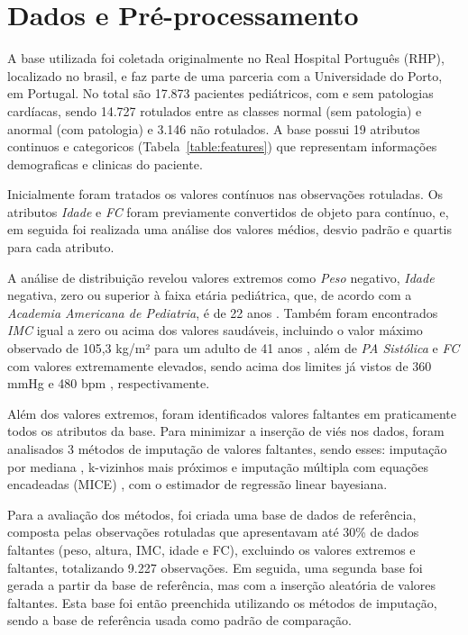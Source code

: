\section{Dados e Pré-processamento}

A base utilizada foi coletada originalmente no Real Hospital Português (RHP), localizado no brasil, e faz parte de uma parceria com a Universidade do Porto, em Portugal. No total são 17.873 pacientes pediátricos, com e sem patologias cardíacas, sendo 14.727 rotulados entre as classes normal (sem patologia) e anormal (com patologia) e 3.146 não rotulados. A base possui 19 atributos continuos e categoricos (Tabela~\ref{table:features}) que representam informações demograficas e clinicas do paciente.

Inicialmente foram tratados os valores contínuos nas observações rotuladas. Os atributos \textit{Idade} e \textit{FC} foram previamente convertidos de objeto para contínuo, e, em seguida foi realizada uma análise dos valores médios, desvio padrão e quartis para cada atributo.

A análise de distribuição revelou valores extremos como \textit{Peso} negativo, \textit{Idade} negativa, zero ou superior à faixa etária pediátrica, que, de acordo com a \textit{Academia Americana de Pediatria}, é de 22 anos \cite{hardin_age_2017}. Também foram encontrados \textit{IMC} igual a zero ou acima dos valores saudáveis, incluindo o valor máximo observado de 105,3 kg/m² para um adulto de 41 anos \cite{morales2010obesidad}, além de \textit{PA Sistólica} e \textit{FC} com valores extremamente elevados, sendo acima dos limites já vistos de 360 mmHg e 480 bpm \cite{narloch_influence_1995, chhabra_mouse_2012}, respectivamente.

Além dos valores extremos, foram identificados valores faltantes em praticamente todos os atributos da base. Para minimizar a inserção de viés nos dados, foram analisados 3 métodos de imputação de valores faltantes, sendo esses: imputação por mediana \cite{berkelmans2022population}, k-vizinhos mais próximos \cite{malarvizhi2012k} e imputação múltipla com equações encadeadas (MICE) \cite{zhang2016multiple}, com o estimador de regressão linear bayesiana.

Para a avaliação dos métodos, foi criada uma base de dados de referência, composta pelas observações rotuladas que apresentavam até 30\% de dados faltantes (peso, altura, IMC, idade e FC), excluindo os valores extremos e faltantes, totalizando 9.227 observações. Em seguida, uma segunda base foi gerada a partir da base de referência, mas com a inserção aleatória de valores faltantes. Esta base foi então preenchida utilizando os métodos de imputação, sendo a base de referência usada como padrão de comparação.

